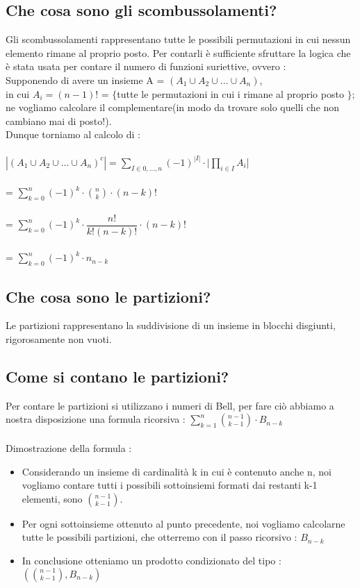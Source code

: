 \documentclass[a4paper,12pt]{report}
\begin{document}
	 \subsection{Che cosa sono gli scombussolamenti?}
	 Gli scombussolamenti rappresentano tutte le possibili permutazioni in cui nessun elemento rimane al proprio posto.
	 Per contarli è sufficiente sfruttare la logica che è stata usata per contare il numero di funzioni suriettive, ovvero : \\
	 Supponendo di avere un insieme A = $(A_1 \cup A_2 \cup ... \cup A_n)$,\\ in cui $A_i = (n - 1)!$ = $\{$tutte le permutazioni in cui i rimane al proprio posto $\}$; ne vogliamo calcolare il complementare(in modo da trovare solo quelli che non cambiano mai di posto!).\\
	 Dunque torniamo al calcolo di : \\\\
	 $|(A_1 \cup A_2 \cup ... \cup A_n)^c| = \sum_{I \in {0, ..., n}}(-1)^{|I|} \cdot |\prod_{i \in I}A_i$| \\\\
	 = $\sum_{k = 0}^{n}(-1)^k \cdot \binom{n}{k} \cdot (n - k)!$ \\\\
	 = $\sum_{k = 0}^{n}(-1)^k \cdot \dfrac{n!}{k!(n-k)!} \cdot (n - k)!$ \\\\
	 = $\sum_{k = 0}^{n}(-1)^k \cdot n_{n-k}$
	 \subsection{Che cosa sono le partizioni?}
	 Le partizioni rappresentano la suddivisione di un insieme in blocchi disgiunti, rigorosamente non vuoti.
	 \subsection{Come si contano le partizioni?}
	 Per contare le partizioni si utilizzano i numeri di Bell, per fare ciò abbiamo a nostra disposizione una formula ricorsiva : $\sum_{k = 1}^{n}\binom{n - 1}{k - 1} \cdot B_{n - k}$ \\\\
	 Dimostrazione della formula : 
	 \begin{itemize}
	 	\item Considerando un insieme di cardinalità k in cui è contenuto anche n, noi vogliamo contare tutti i possibili sottoinsiemi formati dai restanti k-1 elementi, sono $\binom{n-1}{k-1}$.
	 	\item Per ogni sottoinsieme ottenuto al punto precedente, noi vogliamo calcolarne tutte le possibili partizioni, che otterremo con il passo ricorsivo : $B_{n - k}$
	 	\item In conclusione otteniamo un prodotto condizionato del tipo : $(\binom{n-1}{k-1}, B_{n - k})$
	 \end{itemize}
	\newpage
\end{document}
